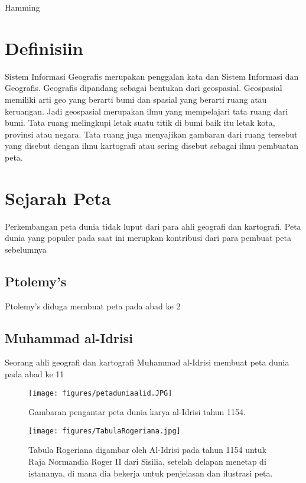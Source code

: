 {Hamming}

\section{Definisiin}
Sistem Informasi Geografis merupakan penggalan kata dan Sistem Informasi dan Geografis. Geografis dipandang sebagai bentukan dari geospasial.
Geospasial memiliki arti geo yang berarti bumi dan spasial yang berarti ruang atau keruangan. Jadi geospasial merupakan ilmu yang mempelajari 
tata ruang dari bumi. Tata ruang melingkupi letak suatu titik di bumi baik itu letak kota, provinsi atau negara. Tata ruang juga menyajikan gambaran dari ruang tersebut yang disebut dengan ilmu kartografi atau sering disebut sebagai ilmu pembuatan peta\cite{IEEEhowto:IEEEtranpage}.

\section{Sejarah Peta}
Perkembangan peta dunia tidak luput dari para ahli geografi dan kartografi. Peta dunia yang populer pada saat ini merupkan kontribusi dari para 
pembuat peta sebelumnya

\subsection{Ptolemy's}
Ptolemy's diduga membuat peta pada abad ke 2


\subsection{Muhammad al-Idrisi}
Seorang ahli geografi dan kartografi Muhammad al-Idrisi membuat peta dunia pada abad ke 11

\begin{figure}[ht]

\centerline{\texttt{[image: figures/petaduniaalid.JPG]}}
\caption{Gambaran pengantar peta dunia karya al-Idrisi tahun 1154.}
\end{figure}

\begin{figure}[ht]
	\centerline{\texttt{[image: figures/TabulaRogeriana.jpg]}}
\vskip2pt
\caption{Tabula Rogeriana digambar oleh Al-Idrisi pada tahun 1154 untuk Raja Normandia Roger II dari Sisilia, setelah delapan menetap di istananya, di mana dia bekerja untuk penjelasan dan ilustrasi peta.}
\end{figure}

